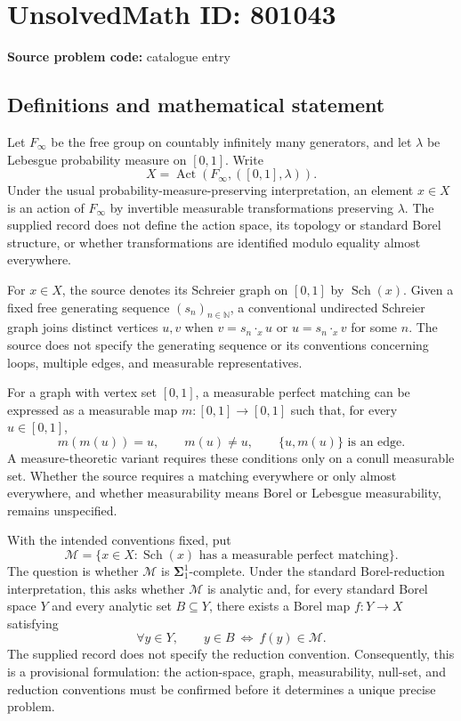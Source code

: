\documentclass[11pt]{article}
\newcommand{\N}{\mathbb{N}}
\begin{document}
\section*{UnsolvedMath ID: 801043}
\textbf{Source problem code:} catalogue entry
\subsection{Definitions and mathematical statement}
Let \(F_\infty\) be the free group on countably infinitely many generators, and let \(\lambda\) be Lebesgue probability measure on \([0,1]\). Write
\[
X=\operatorname{Act}(F_\infty,([0,1],\lambda)).
\]
Under the usual probability-measure-preserving interpretation, an element \(x\in X\) is an action of \(F_\infty\) by invertible measurable transformations preserving \(\lambda\). The supplied record does not define the action space, its topology or standard Borel structure, or whether transformations are identified modulo equality almost everywhere.

For \(x\in X\), the source denotes its Schreier graph on \([0,1]\) by \(\operatorname{Sch}(x)\). Given a fixed free generating sequence \((s_n)_{n\in\N}\), a conventional undirected Schreier graph joins distinct vertices \(u,v\) when \(v=s_n\cdot_x u\) or \(u=s_n\cdot_x v\) for some \(n\). The source does not specify the generating sequence or its conventions concerning loops, multiple edges, and measurable representatives.

For a graph with vertex set \([0,1]\), a measurable perfect matching can be expressed as a measurable map \(m:[0,1]\to[0,1]\) such that, for every \(u\in[0,1]\),
\[
m(m(u))=u,\qquad m(u)\ne u,\qquad
\{u,m(u)\}\text{ is an edge}.
\]
A measure-theoretic variant requires these conditions only on a conull measurable set. Whether the source requires a matching everywhere or only almost everywhere, and whether measurability means Borel or Lebesgue measurability, remains unspecified.

With the intended conventions fixed, put
\[
\mathcal M=\{x\in X:\operatorname{Sch}(x)\text{ has a measurable perfect matching}\}.
\]
The question is whether \(\mathcal M\) is \(\boldsymbol{\Sigma}^{1}_{1}\)-complete. Under the standard Borel-reduction interpretation, this asks whether \(\mathcal M\) is analytic and, for every standard Borel space \(Y\) and every analytic set \(B\subseteq Y\), there exists a Borel map \(f:Y\to X\) satisfying
\[
\forall y\in Y,\qquad y\in B\ \Longleftrightarrow\ f(y)\in\mathcal M.
\]
The supplied record does not specify the reduction convention. Consequently, this is a provisional formulation: the action-space, graph, measurability, null-set, and reduction conventions must be confirmed before it determines a unique precise problem.
\end{document}
